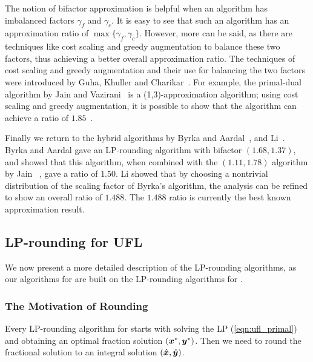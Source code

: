 \documentclass[oneside,final]{ucr}
\begin{document}
The notion of bifactor approximation is helpful when an
algorithm has imbalanced factors $\gamma_f$ and
$\gamma_c$. It is easy to see that such an algorithm has an
approximation ratio of $\max\{\gamma_f,
\gamma_c\}$. However, more can be said, as there are
techniques like cost scaling and greedy augmentation to
balance these two factors, thus achieving a better overall
approximation ratio. The techniques of cost scaling and
greedy augmentation and their use for balancing the two
factors were introduced by Guha, Khuller and
Charikar~\cite{GuhaK98, CharikarG05}. For example, the
primal-dual algorithm by Jain and Vazirani~\cite{JainV03} is
a (1,3)-approximation algorithm; using cost scaling and
greedy augmentation, it is possible to show that the
algorithm can achieve a ratio of $1.85$~\cite{CharikarG05}.

Finally we return to the hybrid algorithms by Byrka and
Aardal~\cite{ByrkaA10}, and Li~\cite{Li11}. Byrka and Aardal
gave an LP-rounding algorithm with bifactor $(1.68,1.37)$,
and showed that this algorithm, when combined with the
$(1.11,1.78)$ algorithm by Jain {\etal}~\cite{JainMMSV03},
gave a ratio of $1.50$. Li showed that by choosing a
nontrivial distribution of the scaling factor of Byrka's
algorithm, the analysis can be refined to show an overall
ratio of $1.488$. The $1.488$ ratio is currently the best
known approximation result.

\subsection{LP-rounding for UFL}
We now present a more detailed description of the
LP-rounding algorithms, as our algorithms for {\FTFP} are
built on the LP-rounding algorithms for {\UFL}.

\subsubsection{The Motivation of Rounding}
Every LP-rounding algorithm for {\UFL} starts with solving
the LP (\ref{eqn:ufl_primal}) and obtaining an optimal
fraction solution $(\boldsymbol{x}^\ast,\boldsymbol{y}^\ast)$. Then we need to
round the fractional solution to an integral solution
$(\hat{\boldsymbol{x}},\hat{\boldsymbol{y}})$.
\end{document}
